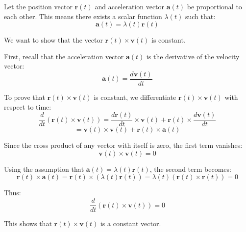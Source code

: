 \documentclass[11pt]{article}
\begin{document}
Let the position vector \( \mathbf{r}(t) \) and acceleration vector \( \mathbf{a}(t) \) be proportional to each other. This means there exists a scalar function \( \lambda(t) \) such that:
\[
\mathbf{a}(t) = \lambda(t) \mathbf{r}(t)
\]

We want to show that the vector \( \mathbf{r}(t) \times \mathbf{v}(t) \) is constant.

First, recall that the acceleration vector \( \mathbf{a}(t) \) is the derivative of the velocity vector:
\[
\mathbf{a}(t) = \frac{d\mathbf{v}(t)}{dt}
\]

To prove that \( \mathbf{r}(t) \times \mathbf{v}(t) \) is constant, we differentiate \( \mathbf{r}(t) \times \mathbf{v}(t) \) with respect to time:
\[
\frac{d}{dt} \left( \mathbf{r}(t) \times \mathbf{v}(t) \right) = \frac{d\mathbf{r}(t)}{dt} \times \mathbf{v}(t) + \mathbf{r}(t) \times \frac{d\mathbf{v}(t)}{dt}
\]
\[
= \mathbf{v}(t) \times \mathbf{v}(t) + \mathbf{r}(t) \times \mathbf{a}(t)
\]

Since the cross product of any vector with itself is zero, the first term vanishes:
\[
\mathbf{v}(t) \times \mathbf{v}(t) = 0
\]

Using the assumption that \( \mathbf{a}(t) = \lambda(t) \mathbf{r}(t) \), the second term becomes:
\[
\mathbf{r}(t) \times \mathbf{a}(t) = \mathbf{r}(t) \times \left( \lambda(t) \mathbf{r}(t) \right) = \lambda(t) \left( \mathbf{r}(t) \times \mathbf{r}(t) \right) = 0
\]

Thus:
\[
\frac{d}{dt} \left( \mathbf{r}(t) \times \mathbf{v}(t) \right) = 0
\]

This shows that \( \mathbf{r}(t) \times \mathbf{v}(t) \) is a constant vector.
\end{document}
